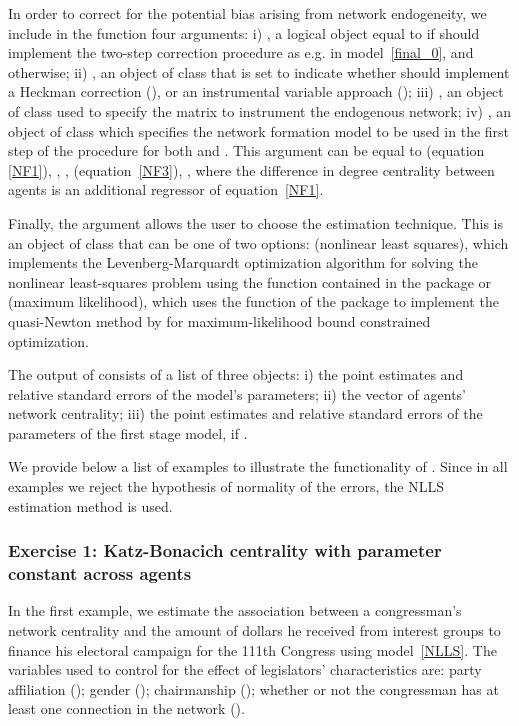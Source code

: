 \documentclass[nojss]{jss}
\begin{document}
In order to correct for the potential bias arising from network endogeneity, we include in the function four arguments: i) , a logical object equal to  if  should implement the two-step correction procedure as e.g. in model~\ref{final_0}, and 
otherwise; ii) , an object of class  that is set to indicate whether  should implement a Heckman correction (), or an instrumental variable approach (); iii) ,
an object of class  used to specify the matrix to instrument the endogenous network; iv) , an object of class  which specifies the network formation model to be used in the first step of the procedure for both  and . This argument can be equal to  (equation~
\ref{NF1}),  \cite[equation~\ref{NF2}, as in][]{Fafchamps+Leij+Goyal:2010},
\cite[equation~\ref{NF2}, as in][]{Graham:2015},  (equation~\ref{NF3}), , where the difference in degree centrality between agents is an additional regressor of equation~\ref{NF1}.

Finally, the argument  allows the user to choose the estimation technique. This is an object of class  that can be one of two options:  (nonlinear least squares), which implements the Levenberg-Marquardt optimization algorithm for solving the nonlinear least-squares problem using the function  contained in the  package  \citep{minpack.lm} or  (maximum likelihood), which uses the function  of the  package  to implement the quasi-Newton method by \cite{bbmle} for maximum-likelihood bound constrained optimization.

The output of  consists of a list of three objects: i) the point estimates and relative standard errors of the model's parameters; ii) the vector of agents' network centrality; iii) the point estimates and relative standard errors of the parameters of the first stage model, if .

We provide below a list of examples to illustrate the functionality of . Since in all examples we reject the hypothesis of normality of the errors, the NLLS estimation method is used.

\subsubsection{Exercise 1: Katz-Bonacich centrality with parameter constant across agents}
In the first example, we estimate the association between a congressman's network centrality and the amount of dollars he received from interest groups to finance his electoral campaign for the 111th Congress using model~\ref{NLLS}. The variables used to control for the effect of legislators' characteristics are: party affiliation (); gender (); chairmanship (); whether or not the congressman has at least one connection in the network ().
\end{document}
